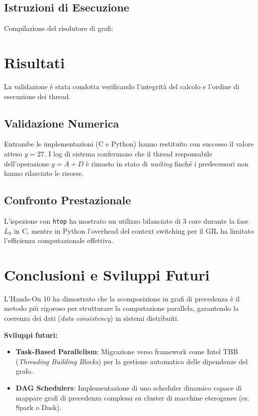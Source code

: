 \documentclass[a4paper,12pt]{article}
\begin{document}
\subsection{Istruzioni di Esecuzione}
Compilazione del risolutore di grafi:

\section{Risultati}
La validazione è stata condotta verificando l'integrità del calcolo e l'ordine di esecuzione dei thread.

\subsection{Validazione Numerica}
Entrambe le implementazioni (C e Python) hanno restituito con successo il valore atteso $y = 27$. I log di sistema confermano che il thread responsabile dell'operazione $y = A + D$ è rimasto in stato di \textit{waiting} finché i predecessori non hanno rilasciato le risorse.

\subsection{Confronto Prestazionale}
L'ispezione con \texttt{htop} ha mostrato un utilizzo bilanciato di 3 core durante la fase $L_0$ in C, mentre in Python l'overhead del context switching per il GIL ha limitato l'efficienza computazionale effettiva.

\section{Conclusioni e Sviluppi Futuri}
L'Hands-On 10 ha dimostrato che la scomposizione in grafi di precedenza è il metodo più rigoroso per strutturare la computazione parallela, garantendo la coerenza dei dati (\textit{data consistency}) in sistemi distribuiti.

\noindent \textbf{Sviluppi futuri:}
\begin{itemize}
    \item \textbf{Task-Based Parallelism}: Migrazione verso framework come Intel TBB (\textit{Threading Building Blocks}) per la gestione automatica delle dipendenze del grafo.
    \item \textbf{DAG Schedulers}: Implementazione di uno scheduler dinamico capace di mappare grafi di precedenza complessi su cluster di macchine eterogenee (es. Spark o Dask).
\end{itemize}
\end{document}

